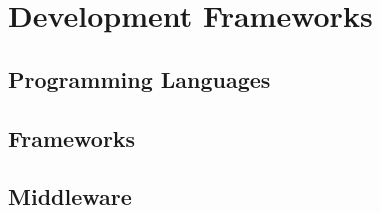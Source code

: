 \chapter{Development Frameworks} \label{ch:development_frameworks}

\section{Programming Languages}

\section{Frameworks}

\section{Middleware}
